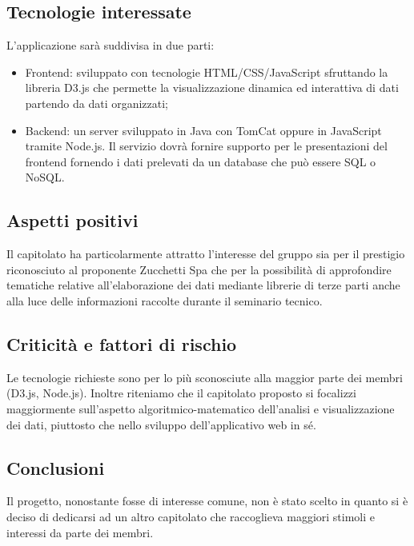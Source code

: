 \subsection{Tecnologie interessate}
L'applicazione sarà suddivisa in due parti:
\begin{itemize}
    \item Frontend: sviluppato con tecnologie HTML/CSS/JavaScript sfruttando la libreria D3.js che permette la visualizzazione dinamica ed interattiva di dati partendo da dati organizzati;
    \item Backend: un server sviluppato in Java con TomCat oppure in JavaScript tramite Node.js. Il servizio dovrà fornire supporto per le presentazioni del frontend fornendo i dati prelevati da un database che può essere SQL o NoSQL.
\end{itemize}

\subsection{Aspetti positivi}
Il capitolato ha particolarmente attratto l'interesse del gruppo sia per il prestigio riconosciuto al proponente Zucchetti Spa che per la possibilità di approfondire tematiche relative all'elaborazione dei dati mediante librerie di terze parti anche alla luce delle informazioni raccolte durante il seminario tecnico.

\subsection{Criticità e fattori di rischio}
Le tecnologie richieste sono per lo più sconosciute alla maggior parte dei membri (D3.js, Node.js). Inoltre riteniamo che il capitolato proposto si focalizzi maggiormente sull'aspetto algoritmico-matematico dell'analisi e visualizzazione dei dati, piuttosto che nello sviluppo dell'applicativo web in sé.

\subsection{Conclusioni}
Il progetto, nonostante fosse di interesse comune, non è stato scelto in quanto si è deciso di dedicarsi ad un altro capitolato che raccoglieva maggiori stimoli e interessi da parte dei membri.
